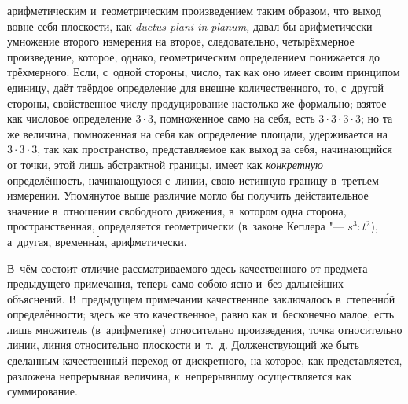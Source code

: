 арифметическим и~геометрическим произведением таким образом, что выход вовне
себя плоскости, как {\em ductus plani in planum,} давал бы арифметически
умножение второго измерения на второе, следовательно, четырёхмерное
произведение, которое, однако, геометрическим определением понижается до
трёхмерного. Если, с~одной стороны, число, так как оно имеет своим принципом
единицу, даёт твёрдое определение для внешне количественного, то, с~другой
стороны, свойственное числу продуцирование настолько же формально; взятое как
числовое определение $3\cdot 3$, помноженное само на себя, есть
$3\cdot 3\cdot 3\cdot 3$; но та же величина, помноженная на себя как определение
площади, удерживается на $3\cdot 3\cdot 3$, так как пространство,
представляемое как выход за себя, начинающийся от точки, этой лишь абстрактной
границы, имеет как {\em конкретную} определённость, начинающуюся с~линии, свою
истинную границу в~третьем измерении. Упомянутое выше различие могло бы
получить действительное значение в~отношении свободного движения, в~котором
одна сторона, пространственная, определяется геометрически (в~законе Кеплера
"--- $s^3:t^2$), а~другая, временн\'{а}я, арифметически.

В~чём состоит отличие рассматриваемого здесь качественного от предмета
предыдущего примечания, теперь само собою ясно и~без дальнейших объяснений.
В~предыдущем примечании качественное заключалось в~степенн\'{о}й
определённости; здесь же это качественное, равно как и~бесконечно малое, есть
лишь множитель (в~арифметике) относительно произведения, точка относительно
линии, линия относительно плоскости и~т.~д. Долженствующий же быть сделанным
качественный переход от дискретного, на которое, как представляется, разложена
непрерывная величина, к~непрерывному осуществляется как суммирование.

